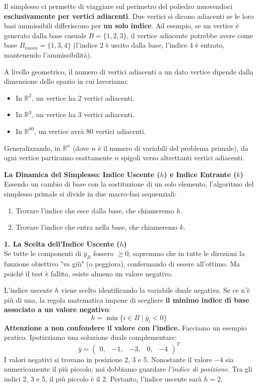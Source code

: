 \documentclass[12pt, a4paper]{article}
\begin{document}
	Il simplesso ci permette di viaggiare sul perimetro del poliedro muovendoci \textbf{esclusivamente per vertici adiacenti}. 
	Due vertici si dicono adiacenti se le loro basi ammissibili differiscono per \textbf{un solo indice}. 
	Ad esempio, se un vertice è generato dalla base casuale $B = \{1, 2, 3\}$, il vertice adiacente potrebbe avere come base $B_{nuova} = \{1, 3, 4\}$ (l'indice $2$ è uscito dalla base, l'indice $4$ è entrato, mantenendo l'ammissibilità).
	
	A livello geometrico, il numero di vertici adiacenti a un dato vertice dipende dalla dimensione dello spazio in cui lavoriamo:
	\begin{itemize}[label=\textcolor{titlecolor}{\Large\textbullet}, itemsep=2pt, leftmargin=1.5cm]
		\item In $\mathbb{R}^2$, un vertice ha 2 vertici adiacenti.
		\item In $\mathbb{R}^3$, un vertice ha 3 vertici adiacenti.
		\item In $\mathbb{R}^{80}$, un vertice avrà 80 vertici adiacenti.
	\end{itemize}
	Generalizzando, in $\mathbb{R}^n$ (dove $n$ è il numero di variabili del problema primale), da ogni vertice partiranno esattamente $n$ spigoli verso altrettanti vertici adiacenti.
	
	\vspace{0.4cm}
	\textbf{La Dinamica del Simplesso: Indice Uscente ($h$) e Indice Entrante ($k$)}\\
	Essendo un cambio di base con la sostituzione di un solo elemento, l'algoritmo del simplesso primale si divide in due macro-fasi sequenziali:
	\begin{enumerate}
		\item Trovare l'indice che esce dalla base, che chiameremo \textbf{$h$}.
		\item Trovare l'indice che entra nella base, che chiameremo \textbf{$k$}.
	\end{enumerate}
	
	\vspace{0.3cm}
	\textbf{1. La Scelta dell'Indice Uscente ($h$)}\\
	Se tutte le componenti di $\bar{y}_B$ fossero $\geq 0$, sapremmo che in tutte le direzioni la funzione obiettivo "va giù" (o peggiora), confermando di essere all'ottimo. Ma poiché il test è fallito, esiste almeno un valore negativo. 
	
	L'indice uscente $h$ viene scelto identificando la variabile duale negativa. Se ce n'è più di una, la regola matematica impone di scegliere \textbf{il minimo indice di base associato a un valore negativo}:
	\[
	h = \min \{ i \in B \mid \bar{y}_i < 0 \}
	\]
	\textbf{Attenzione a non confondere il valore con l'indice.} Facciamo un esempio pratico. Ipotizziamo una soluzione duale complementare:
	\[
	\bar{y} = \begin{pmatrix} 0, & -1, & -3, & 0, & -4 \end{pmatrix}^T
	\]
	I valori negativi si trovano in posizione 2, 3 e 5. Nonostante il valore $-4$ sia numericamente il più piccolo, noi dobbiamo guardare \textit{l'indice di posizione}. Tra gli indici 2, 3 e 5, il più piccolo è il 2. Pertanto, l'indice uscente sarà $h = 2$.
	
\end{document}

